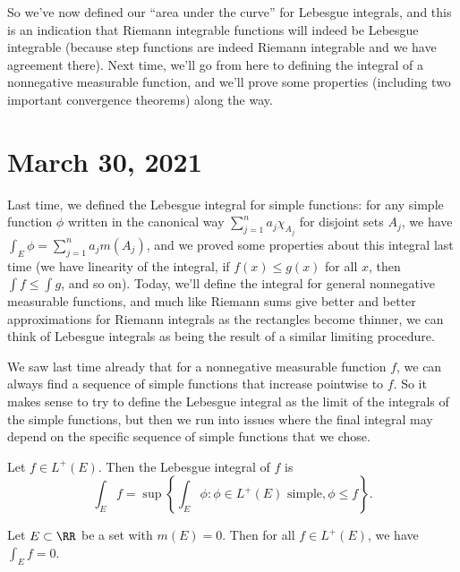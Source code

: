 So we've now defined our ``area under the curve'' for Lebesgue integrals, and this is an indication that Riemann integrable functions will indeed be Lebesgue integrable (because step functions are indeed Riemann integrable and we have agreement there). Next time, we'll go from here to defining the integral of a nonnegative measurable function, and we'll prove some properties (including two important convergence theorems) along the way.


\pagebreak\section*{March 30, 2021}

Last time, we defined the Lebesgue integral for simple functions: for any simple function $\phi$ written in the canonical way $\sum_{j=1}^n a_j \chi_{A_j}$ for disjoint sets $A_j$, we have $\int_E \phi = \sum_{j=1}^n a_j m(A_j)$, and we proved some properties about this integral last time (we have linearity of the integral, if $f(x) \le g(x)$ for all $x$, then $\int f \le \int g$, and so on). Today, we'll define the integral for general nonnegative measurable functions, and much like Riemann sums give better and better approximations for Riemann integrals as the rectangles become thinner, we can think of Lebesgue integrals as being the result of a similar limiting procedure.

We saw last time already that for a nonnegative measurable function $f$, we can always find a sequence of simple functions that increase pointwise to $f$. So it makes sense to try to define the Lebesgue integral as the limit of the integrals of the simple functions, but then we run into issues where the final integral may depend on the specific sequence of simple functions that we chose.

\begin{definition}
Let $f \in L^+(E)$. Then the Lebesgue integral of $f$ is
\[
    \int_E f = \sup\left\{\int_E \phi: \phi \in L^+(E) \text{ simple}, \phi \le f\right\}.
\]
\end{definition}

\begin{proposition}\label{lebesgdefn1}
Let $E \subset \RR$ be a set with $m(E) = 0$. Then for all $f \in L^+(E)$, we have $\int_E f = 0$.
\end{proposition}

